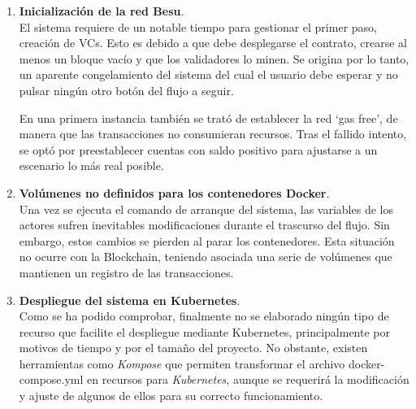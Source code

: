 \documentclass[../main.tex]{subfiles}
\begin{document}
\begin{enumerate}
    \item \textbf{Inicialización de la red Besu}. \\
    El sistema requiere de un notable tiempo para gestionar el primer paso, creación de \acrshort{VC}s. Esto es debido a que debe desplegarse el contrato, crearse al menos un bloque vacío y que los validadores lo minen. Se origina por lo tanto, un aparente congelamiento del sistema del cual el usuario debe esperar y no pulsar ningún otro botón del flujo a seguir.

    En una primera instancia también se trató de establecer la red `gas free', de manera que las transacciones no consumieran recursos. Tras el fallido intento, se optó por preestablecer cuentas con saldo positivo para ajustarse a un escenario lo más real posible.

    \item \textbf{Volúmenes no definidos para los contenedores Docker}. \\
    Una vez se ejecuta el comando de arranque del sistema, las variables de los actores sufren inevitables modificaciones durante el trascurso del flujo. Sin embargo, estos cambios se pierden al parar los contenedores. Esta situación no ocurre con la Blockchain, teniendo asociada una serie de volúmenes que mantienen un registro de las transacciones.
    
    \item \textbf{Despliegue del sistema en Kubernetes}. \\
    Como se ha podido comprobar, finalmente no se elaborado ningún tipo de recurso que facilite el despliegue mediante Kubernetes, principalmente por motivos de tiempo y por el tamaño del proyecto. No obstante, existen herramientas como \textit{Kompose} que permiten transformar el archivo docker-compose.yml en recursos para \textit{Kubernetes}, aunque se requerirá la modificación y ajuste de algunos de ellos para su correcto funcionamiento.

\end{enumerate}
\end{document}
